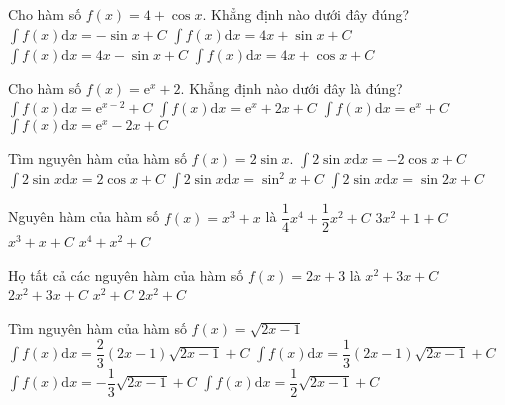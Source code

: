 \begin{ex}
	[Mã 101 - 2021 - Lần 2]%
	Cho hàm số $ f(x)=4+\cos x$. Khẳng định nào dưới đây đúng?
	\choice
	{$\displaystyle\int{f(x)\mathrm{d}x=-\sin x+C}$}
	{\True $\displaystyle\int{f(x)\mathrm{d}x=4x+\sin x+C}$}
	{$\displaystyle\int{f(x)\mathrm{d}x=4x-\sin x+C}$}
	{$\displaystyle\int{f(x)\mathrm{d}x=4x+\cos x+C}$}
\end{ex}
\begin{ex}
	[Mã 101 - 2021 - Lần 1]%
	Cho hàm số $ f(x)=\mathrm{e}^x+2$. Khẳng định nào dưới đây là đúng?
	\choice
	{$\displaystyle\int{f(x)}\mathrm{d}x=\mathrm{e}^{x-2}+C$}
	{\True $\displaystyle\int{f(x)}\mathrm{d}x=\mathrm{e}^x+2x+C$}
	{$\displaystyle\int{f(x)}\mathrm{d}x=\mathrm{e}^x+C$}
	{$\displaystyle\int{f(x)}\mathrm{d}x=\mathrm{e}^x-2x+C$}
\end{ex}
\begin{ex}
	[Mã 105 2017]%
	Tìm nguyên hàm của hàm số $ f(x)=2\sin x$.
	\choice
	{\True $\displaystyle\int{2\sin x\mathrm{d}x=-2\cos x+C}$}
	{$\displaystyle\int{2\sin x\mathrm{d}x=2\cos x+C}$}
	{$\displaystyle\int{2\sin x\mathrm{d}x=\sin^2x+C}$}
	{$\displaystyle\int{2\sin x\mathrm{d}x=\sin 2x+C}$}
	\loigiai{}
\end{ex}
\begin{ex}
	[Mã 101 2018]%
	Nguyên hàm của hàm số $ f(x)=x^3+x$ là
	\choice
	{\True $\dfrac{1}{4}{x^4}+\dfrac{1}{2}{x^2}+C$}
	{$ 3x^2+1+C$}
	{$x^3+x+C$}
	{$x^4+x^2+C$}
\end{ex}
\begin{ex}
	[Mã 103 - 2019]%
	Họ tất cả các nguyên hàm của hàm số $ f(x)=2x+3$ là
	\choice
	{\True $x^2+3x+C$}
	{$ 2x^2+3x+C$}
	{$x^2+C$}
	{$ 2x^2+C$}
\end{ex}
\begin{ex}
	Tìm nguyên hàm của hàm số $ f(x)=\sqrt{2x-1}$
	\choice
	{$\displaystyle\int{f(x)\mathrm{d}x=\dfrac{2}{3}\left(2x-1\right)\sqrt{2x-1}+C}$}
	{\True $\displaystyle\int{f(x)\mathrm{d}x=\dfrac{1}{3}\left(2x-1\right)\sqrt{2x-1}+C}$}
	{$\displaystyle\int{f(x)\mathrm{d}x=-\dfrac{1}{3}\sqrt{2x-1}+C}$}
	{$\displaystyle\int{f(x)\mathrm{d}x=\dfrac{1}{2}\sqrt{2x-1}+C}$}
\end{ex}
